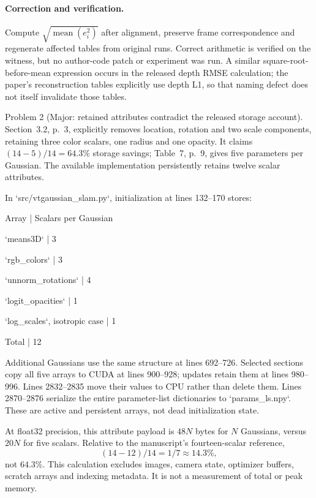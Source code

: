 \documentclass[10pt]{article}
\begin{document}
\paragraph*{Correction and verification.}\mbox{}\par
Compute \(\sqrt{\operatorname{mean}(e_i^2)}\) after alignment, preserve frame correspondence and regenerate affected tables from original runs. Correct arithmetic is verified on the witness, but no author-code patch or experiment was run. A similar square-root-before-mean expression occurs in the released depth RMSE calculation; the paper’s reconstruction tables explicitly use depth L1, so that naming defect does not itself invalidate those tables.\par
Problem 2 (Major: retained attributes contradict the released storage account).  Section 3.2, p. 3, explicitly removes location, rotation and two scale components, retaining three color scalars, one radius and one opacity. It claims \((14-5)/14=64.3\%\) storage savings; Table 7, p. 9, gives five parameters per Gaussian. The available implementation persistently retains twelve scalar attributes.\par
In `src/vtgaussian\_slam.py`, initialization at lines 132–170 stores:\par
Array | Scalars per Gaussian\par
`means3D` | 3\par
`rgb\_colors` | 3\par
`unnorm\_rotations` | 4\par
`logit\_opacities` | 1\par
`log\_scales`, isotropic case | 1\par
Total | 12\par
Additional Gaussians use the same structure at lines 692–726. Selected sections copy all five arrays to CUDA at lines 900–928; updates retain them at lines 980–996. Lines 2832–2835 move their values to CPU rather than delete them. Lines 2870–2876 serialize the entire parameter-list dictionaries to `params\_ls.npy`. These are active and persistent arrays, not dead initialization state.\par
At float32 precision, this attribute payload is \(48N\) bytes for \(N\) Gaussians, versus \(20N\) for five scalars. Relative to the manuscript’s fourteen-scalar reference, \[(14-12)/14=1/7\approx14.3\%,\] not \(64.3\%\). This calculation excludes images, camera state, optimizer buffers, scratch arrays and indexing metadata. It is not a measurement of total or peak memory.\par
\end{document}
